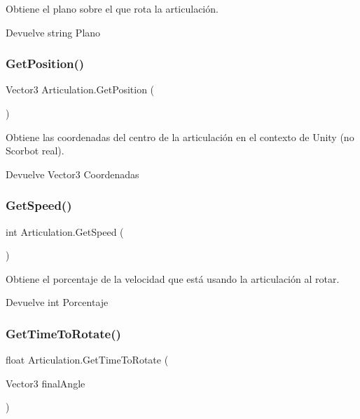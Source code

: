 Obtiene el plano sobre el que rota la articulación. \begin{DoxyReturn}{Devuelve}
string Plano 
\end{DoxyReturn}
\mbox{\label{class_articulation_a1a7ef254573e5d539a24d6ce58f93911}} 
\subsubsection{\texorpdfstring{GetPosition()}{GetPosition()}}
{\footnotesize\ttfamily Vector3 Articulation.\+Get\+Position (\begin{DoxyParamCaption}{ }\end{DoxyParamCaption})\hspace{0.3cm}{\ttfamily [inline]}}

Obtiene las coordenadas del centro de la articulación en el contexto de Unity (no Scorbot real). \begin{DoxyReturn}{Devuelve}
Vector3 Coordenadas 
\end{DoxyReturn}
\mbox{\label{class_articulation_af125f382466f26db3296f90fb896fd5a}} 
\subsubsection{\texorpdfstring{GetSpeed()}{GetSpeed()}}
{\footnotesize\ttfamily int Articulation.\+Get\+Speed (\begin{DoxyParamCaption}{ }\end{DoxyParamCaption})\hspace{0.3cm}{\ttfamily [inline]}}

Obtiene el porcentaje de la velocidad que está usando la articulación al rotar. \begin{DoxyReturn}{Devuelve}
int Porcentaje 
\end{DoxyReturn}
\mbox{\label{class_articulation_a67d26d51e7a88fd6feea21cdd9f43db4}} 
\subsubsection{\texorpdfstring{GetTimeToRotate()}{GetTimeToRotate()}}
{\footnotesize\ttfamily float Articulation.\+Get\+Time\+To\+Rotate (\begin{DoxyParamCaption}\item[{Vector3}]{final\+Angle }\end{DoxyParamCaption})\hspace{0.3cm}{\ttfamily [inline]}}

